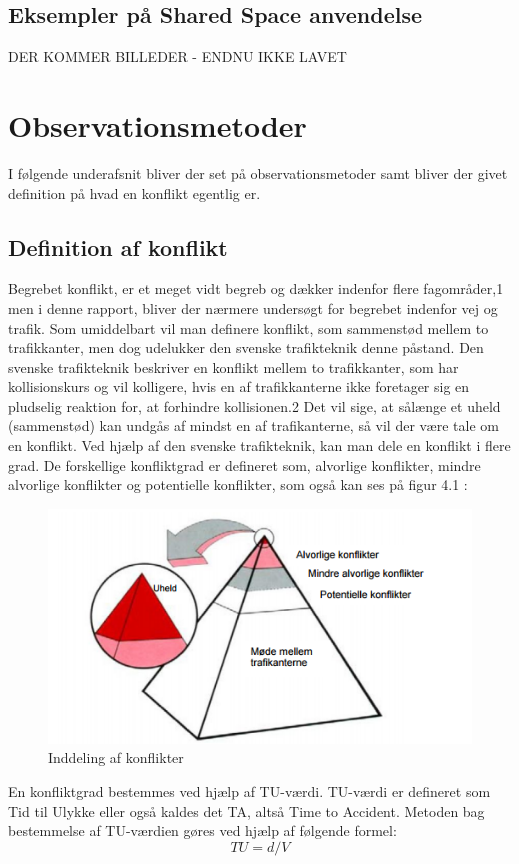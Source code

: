\subsection{Eksempler på Shared Space anvendelse}
\label{sub:eks_shared_space}
DER KOMMER BILLEDER - ENDNU IKKE LAVET


\section{Observationsmetoder}
\label{sec:observationsmetoder}
I følgende underafsnit bliver der set på observationsmetoder samt bliver der givet definition på hvad en konflikt egentlig er.
\subsection{Definition af konflikt}
\label{sub:def_konflikt}
Begrebet konflikt, er et meget vidt begreb og dækker indenfor flere fagområder,1 men i denne rapport, bliver der nærmere undersøgt for begrebet indenfor vej og trafik. Som umiddelbart vil man definere konflikt, som sammenstød mellem to trafikkanter, men dog udelukker den svenske trafikteknik denne påstand. Den svenske trafikteknik beskriver en konflikt mellem to trafikkanter, som har kollisionskurs og vil kolligere, hvis en af trafikkanterne ikke foretager sig en pludselig reaktion for, at forhindre kollisionen.2 Det vil sige, at sålænge et uheld (sammenstød) kan undgås af mindst en af trafikanterne, så vil der være tale om en konflikt. Ved hjælp af den svenske trafikteknik, kan man dele en konflikt i flere grad. De forskellige konfliktgrad er defineret som, alvorlige konflikter, mindre alvorlige konflikter og potentielle konflikter, som også kan ses på figur 4.1 :
 \begin{figure}[htbp]
   \label{fig:indellingkonflikter}
   \centering
   \begin{adjustbox}{max width=\textwidth}
     \includegraphics{billederogfigur/konflikt.png} %
  \end{adjustbox}
   \caption{Inddeling af konflikter}
 \end{figure}
\newpage
 En konfliktgrad bestemmes ved hjælp af TU-værdi. TU-værdi er defineret som Tid til Ulykke eller også kaldes det TA, altså Time to Accident. Metoden bag bestemmelse af TU-værdien gøres ved hjælp af følgende formel:
 \begin{equation}
  TU=d/V
\end{equation}


